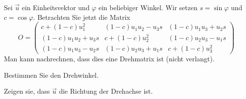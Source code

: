 Sei $\vec u$ ein Einheitsvektor und $\varphi$ ein beliebiger Winkel.
Wir setzen $s=\sin\varphi$ und $c=\cos\varphi$. Betrachten Sie jetzt
die Matrix
\[
O=\begin{pmatrix}
c+(1-c)u_1^2    &(1-c)u_1u_2-u_3s   &(1-c)u_1u_3+u_2s\\
(1-c)u_1u_2+u_3s&c+(1-c)u_2^2       &(1-c)u_2u_3-u_1s\\
(1-c)u_1u_3-u_2s&(1-c)u_2u_3+u_1s   &c+(1-c)u_3^2
\end{pmatrix}
\]
Man kann nachrechnen, dass dies eine Drehmatrix ist (nicht verlangt).
\begin{teilaufgaben}
\item Bestimmen Sie den Drehwinkel.
\item Zeigen sie, dass $\vec u$ die Richtung der Drehachse ist.
\end{teilaufgaben}


